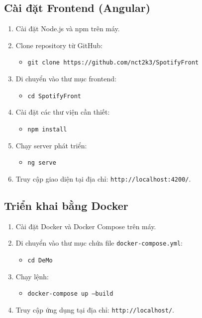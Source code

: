 \subsection{Cài đặt Frontend (Angular)}
\begin{enumerate}
    \item Cài đặt Node.js và npm trên máy.
    \item Clone repository từ GitHub:
    \begin{itemize}
        \item \texttt{git clone https://github.com/nct2k3/SpotifyFront}
    \end{itemize}
    \item Di chuyển vào thư mục frontend:
    \begin{itemize}
        \item \texttt{cd SpotifyFront}
    \end{itemize}
    \item Cài đặt các thư viện cần thiết:
    \begin{itemize}
        \item \texttt{npm install}
    \end{itemize}
    \item Chạy server phát triển:
    \begin{itemize}
        \item \texttt{ng serve}
    \end{itemize}
    \item Truy cập giao diện tại địa chỉ: \texttt{http://localhost:4200/}.
\end{enumerate}

\subsection{Triển khai bằng Docker}
\begin{enumerate}
    \item Cài đặt Docker và Docker Compose trên máy.
    \item Di chuyển vào thư mục chứa file \texttt{docker-compose.yml}:
    \begin{itemize}
        \item \texttt{cd DeMo}
    \end{itemize}
    \item Chạy lệnh:
    \begin{itemize}
        \item \texttt{docker-compose up --build}
    \end{itemize}
    \item Truy cập ứng dụng tại địa chỉ: \texttt{http://localhost/}.
\end{enumerate}
